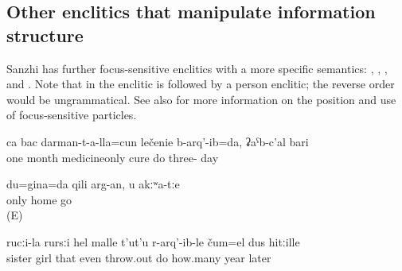 
\subsection{Other enclitics that manipulate information structure}
\label{ssec:Further enclitics that manipulate the information structure}

Sanzhi has further focus-sensitive enclitics with a more specific semantics:   ,   ,   , and   . Note that in  the enclitic  is followed by a person enclitic; the reverse order would be ungrammatical. See also  for more information on the position and use of focus-sensitive particles.
%
\begin{exe}
	\ex	\label{ex:‎‎‎For one month I was cured only with pills, for 30 days minor}
	\gll	ca	bac	darman-t-a-lla=cun	lečenie	b-arq'-ib=da,	ʡaˁb-c'al	bari\\
		one	month	medicineonly	cure	do	three-	day\\
	\glt	{}

	\ex	\label{ex:Only I / I alone will go home, not you minor@6}
	\gll	du=gina=da	qili	arg-an,	u	akːʷa-tːe\\
		only	home	go		\\
	\glt	{} (E)

	\ex	\label{ex:‎‎‎Even his sisters daughter did he throw out, after some years minor}
	\gll	rucːi-la	rursːi	hel	malle	t'ut'u	r-arq'-ib-le	čum=el	dus	hitːille\\
		sister	girl	that	even	throw.out	do	how.many	year	later\\
	\glt	{}
\end{exe}

